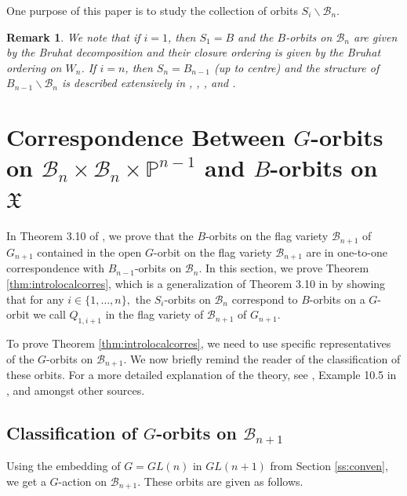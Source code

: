 \documentclass[12pt]{amsart}
\numberwithin{equation}{section}
\newtheorem{rem}[thm]{Remark}
\newcommand{\B}{\mathcal{B}}
\newcommand{\Borbitspace}{B_{n-1}\backslash\B_{n}}
\begin{document}
\noindent One purpose of this paper is to study the collection of orbits $S_{i}\backslash\B_{n}$.  
\begin{rem}\label{r:specialcase}
We note that if $i=1$, then $S_{1}=B$ and the $B$-orbits on $\B_{n}$ are given by the Bruhat decomposition and their closure ordering is given by the Bruhat ordering on $W_{n}$.  If $i=n$, then $S_{n}=B_{n-1}$ (up to centre) and the structure of $B_{n-1}\backslash\B_{n}$ is described extensively in \cite{Hashi}, \cite{CE21I}, \cite{CE21II}, and \cite{Shpairs}. 
\end{rem}




\section{Correspondence Between $G$-orbits on $\B_{n}\times\B_{n}\times\mathbb{P}^{n-1}$ and $B$-orbits on $\mathfrak{X}$}\label{s:Gorbits}
 In Theorem 3.10 of \cite{CE21I}, we prove that the $B$-orbits on the flag variety $\B_{n+1}$ of $G_{n+1}$ contained in the open $G$-orbit on the flag variety $\B_{n+1}$ are in one-to-one correspondence with $B_{n-1}$-orbits on $\B_{n}.$ 
 In this section, we prove Theorem \ref{thm:introlocalcorres}, which is a generalization of Theorem 3.10 in \cite{CE21I} by showing that for any $i\in\{1,\dots, n\},$ the $S_{i}$-orbits on $\B_{n}$ correspond to $B$-orbits on a $G$-orbit we call $Q_{1,i+1}$ in the flag variety of $\B_{n+1}$ of $G_{n+1}$.  


To prove Theorem \ref{thm:introlocalcorres}, we need to use specific representatives of the $G$-orbits on $\B_{n+1}$.  We now briefly remind the reader of the classification of these orbits.  For a more detailed explanation of the theory, see \cite{Collingwood}, Example 10.5 in \cite{RSexp}, and \cite{CEexp} amongst other sources. 
\subsection{Classification of $G$-orbits on $\B_{n+1}$}
Using the embedding of $G=GL(n)$ in $GL(n+1)$ from Section \ref{ss:conven},  we get a $G$-action on $\B_{n+1}.$   These orbits are given as follows.
\end{document}
